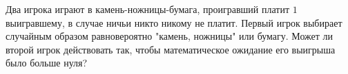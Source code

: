 Два игрока играют в камень-ножницы-бумага, проигравший платит $1$ выигравшему, в случае ничьи никто никому не платит. Первый
игрок выбирает случайным образом равновероятно "камень, ножницы" или бумагу. Может ли второй игрок действовать так, чтобы
математическое ожидание его выигрыша было больше нуля?